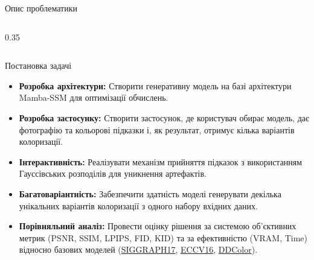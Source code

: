 \documentclass[10pt, aspectratio=169, xcolor=table]{beamer}
\begin{document}
\begin{frame}{Опис проблематики}
\begin{columns}[T]
\begin{column}{0.35\textwidth}
{\begin{tikzpicture}[
                        arrow/.style={->, ultra thick, >=stealth, color=white}
                    ]
                    \end{tikzpicture}
                }
                
            \end{column}
        \end{columns}
    \end{frame}

    \begin{frame}{Постановка задачі}
        \begin{itemize}
            \item \textbf{Розробка архітектури:} Створити генеративну модель на базі архітектури Mamba-SSM для оптимізації обчислень.
            \item \textbf{Розробка застосунку:} Створити застосунок, де користувач обирає модель, дає фотографію та кольорові підказки і, як результат, отримує кілька варіантів колоризації.
            \item \textbf{Інтерактивність:} Реалізувати механізм прийняття підказок з використанням Гауссівських розподілів для уникнення артефактів.
            \item \textbf{Багатоваріантність:} Забезпечити здатність моделі генерувати декілька унікальних варіантів колоризації з одного набору вхідних даних.
            \item \textbf{Порівняльний аналіз:} Провести оцінку рішення за системою об'єктивних метрик (PSNR, SSIM, LPIPS, FID, KID) та за ефективністю (VRAM, Time) відносно базових моделей (\href{https://arxiv.org/pdf/1705.02999}{SIGGRAPH17}, \href{https://arxiv.org/pdf/1603.08511}{ECCV16}, \href{https://arxiv.org/pdf/2212.11613}{DDColor}).
        \end{itemize}
    \end{frame}
\end{document}
